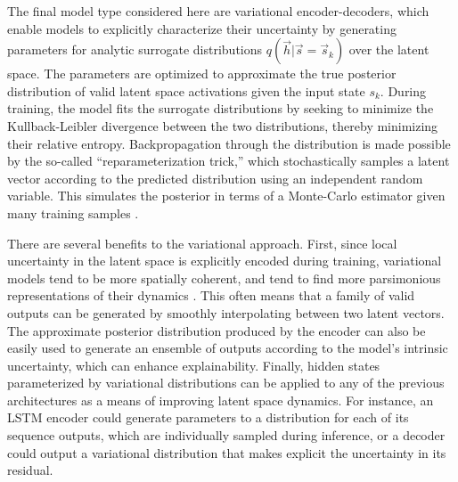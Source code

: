 \documentclass[11pt]{article}
\begin{document}
\begin{multicols}{2}
    The final model type considered here are variational encoder-decoders, which enable models to explicitly characterize their uncertainty by generating parameters for analytic surrogate distributions $q(\vec{h}|\vec{s}=\vec{s}_k)$ over the latent space. The parameters are optimized to approximate the true posterior distribution of valid latent space activations given the input state $s_k$. During training, the model fits the surrogate distributions by seeking to minimize the Kullback-Leibler divergence between the two distributions, thereby minimizing their relative entropy. Backpropagation through the distribution is made possible by the so-called ``reparameterization trick,'' which stochastically samples a latent vector according to the predicted distribution using an independent random variable. This simulates the posterior in terms of a Monte-Carlo estimator given many training samples \cite{kingma_auto-encoding_2014}\cite{ganguly_amortized_2023}.

    There are several benefits to the variational approach. First, since local uncertainty in the latent space is explicitly encoded during training, variational models tend to be more spatially coherent, and tend to find more parsimonious representations of their dynamics \cite{lopez_gd-vaes_2022}. This often means that a family of valid outputs can be generated by smoothly interpolating between two latent vectors. The approximate posterior distribution produced by the encoder can also be easily used to generate an ensemble of outputs according to the model's intrinsic uncertainty, which can enhance explainability. Finally, hidden states parameterized by variational distributions can be applied to any of the previous architectures as a means of improving latent space dynamics. For instance, an LSTM encoder could generate parameters to a distribution for each of its sequence outputs, which are individually sampled during inference, or a decoder could output a variational distribution that makes explicit the uncertainty in its residual.


\end{multicols}
\end{document}
